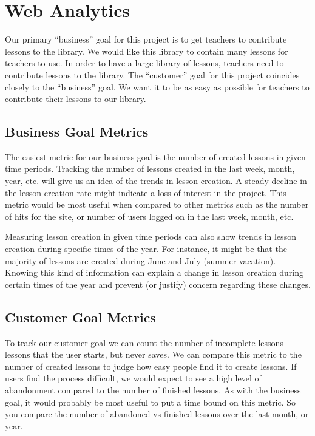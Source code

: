 \documentclass[10pt,letter]{article}
\begin{document}
\section{Web Analytics}
Our primary ``business'' goal for this project is to get teachers to contribute
lessons to the library. We would like this library to contain many lessons for
teachers to use. In order to have a large library of lessons, teachers need to
contribute lessons to the library. The ``customer'' goal for this project
coincides closely to the ``business'' goal. We want it to be as easy as possible
for teachers to contribute their lessons to our library.

\subsection{Business Goal Metrics}
The easiest metric for our business goal is the number of created lessons in
given time periods. Tracking the number of lessons created in the last week,
month, year, etc. will give us an idea of the trends in lesson creation. A
steady decline in the lesson creation rate might indicate a loss of interest in
the project. This metric would be most useful when compared to other metrics
such as the number of hits for the site, or number of users logged on in the
last week, month, etc.

Measuring lesson creation in given time periods can also show trends in lesson
creation during specific times of the year. For instance, it might be that the
majority of lessons are created during June and July (summer vacation). Knowing
this kind of information can explain a change in lesson creation during certain
times of the year and prevent (or justify) concern regarding these changes.

\subsection{Customer Goal Metrics}
To track our customer goal we can count the number of incomplete lessons --
lessons that the user starts, but never saves. We can compare this metric to the
number of created lessons to judge how easy people find it to create lessons.
If users find the process difficult, we would expect to see a high level of
abandonment compared to the number of finished lessons. As with the business
goal, it would probably be most useful to put a time bound on this metric. So
you compare the number of abandoned vs finished lessons over the last month, or
year.
\end{document}
